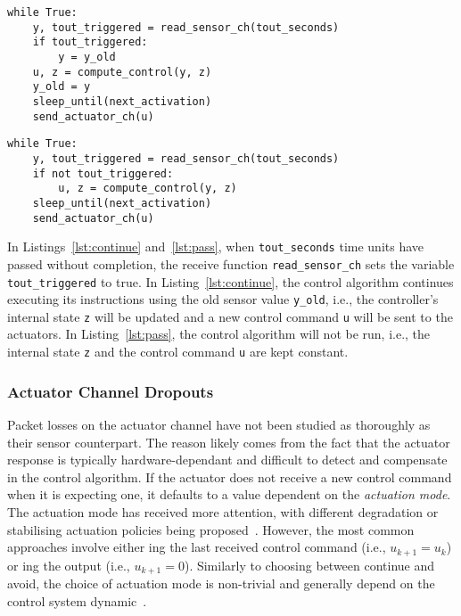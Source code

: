 \begin{lstlisting}[label=lst:continue,caption={Control code execution when the control computation is continued if the sensor reading function \texttt{read\_sensor\_ch} results in a timeout.}]
while True:
    y, tout_triggered = read_sensor_ch(tout_seconds)
    if tout_triggered:
        y = y_old
    u, z = compute_control(y, z)
    y_old = y
    sleep_until(next_activation)
    send_actuator_ch(u)
\end{lstlisting}
%
\newpage
\begin{lstlisting}[label=lst:pass,caption={Control code execution when the control computation is avoided if the sensor reading function \texttt{read\_sensor\_ch} results in a timeout.}]
while True:
    y, tout_triggered = read_sensor_ch(tout_seconds)
    if not tout_triggered:
        u, z = compute_control(y, z)
    sleep_until(next_activation)
    send_actuator_ch(u)
\end{lstlisting}

In Listings~\ref{lst:continue} and~\ref{lst:pass}, when \texttt{tout\_seconds} time units have passed without completion, the receive function \texttt{read\_sensor\_ch} sets the variable \texttt{tout\_triggered} to true.
In Listing~\ref{lst:continue}, the control algorithm continues executing its instructions using the old sensor value \texttt{y\_old}, i.e., the controller's internal state \texttt{z} will be updated and a new control command \texttt{u} will be sent to the actuators.
In Listing~\ref{lst:pass}, the control algorithm will not be run, i.e., the internal state \texttt{z} and the control command \texttt{u} are kept constant.

\subsubsection*{Actuator Channel Dropouts}
Packet losses on the actuator channel have not been studied as thoroughly as their sensor counterpart.
The reason likely comes from the fact that the actuator response is typically hardware-dependant and difficult to detect and compensate in the control algorithm.
If the actuator does not receive a new control command when it is expecting one, it defaults to a value dependent on the \emph{actuation mode}.
The actuation mode has received more attention, with different degradation or stabilising actuation policies being proposed~\cite{Ma:2018}.
However, the most common approaches involve either \tH{}ing the last received control command (i.e., $u_{k+1} = u_k$) or \tZ{}ing the output (i.e., $u_{k+1}=0$).
Similarly to choosing between continue and avoid, the choice of actuation mode is non-trivial and generally depend on the control system dynamic~\cite{Schenato:2009, Vreman:2021}.


